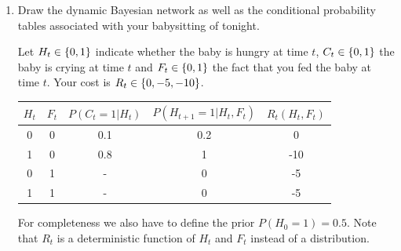 \documentclass[11pt, a4paper]{article}
\begin{document}
\begin{enumerate}
    \item Draw the dynamic Bayesian network as well as the conditional probability tables associated with your babysitting of tonight.

    \begin{solution}
        Let $H_t \in \{0, 1\}$ indicate whether the baby is hungry at time $t$, $C_t \in \{0, 1\}$ the baby is crying at time $t$ and $F_t \in \{0, 1\}$ the fact that you fed the baby at time $t$. Your cost is $R_t \in \{0, -5, -10\}$.

        \begin{figure}[h]
            \centering
        \end{figure}

        \begin{table}[h]
            \centering
            \begin{tabular}{cc|cc|c}
                \toprule
                $H_t$ & $F_t$ & $P(C_t = 1 | H_t)$ & $P(H_{t+1} = 1 | H_t, F_t)$ & $R_t(H_t, F_t)$ \\
                \midrule
                0 & 0 & 0.1 & 0.2 & 0 \\
                1 & 0 & 0.8 & 1 & -10 \\
                0 & 1 & -  & 0 & -5 \\
                1 & 1 & -  & 0 & -5 \\
                \bottomrule
            \end{tabular}
        \end{table}

        For completeness we also have to define the prior $P(H_0 = 1) = 0.5$. Note that $R_t$ is a deterministic function of $H_t$ and $F_t$ instead of a distribution.
    \end{solution}


\end{enumerate}
\end{document}
